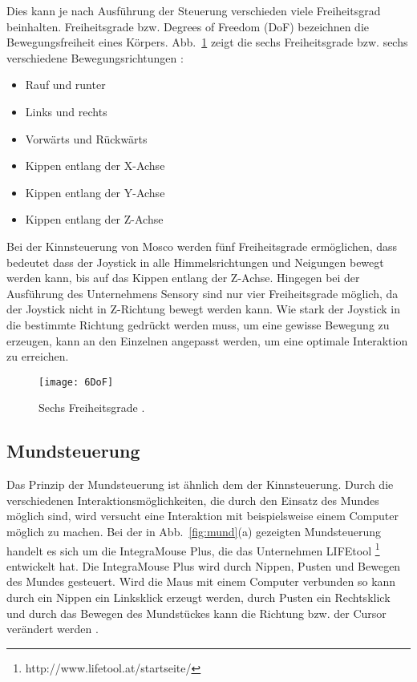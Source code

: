 \newline
Dies kann je nach Ausführung der Steuerung verschieden viele Freiheitsgrad beinhalten. Freiheitsgrade bzw. Degrees of Freedom (DoF) bezeichnen die Bewegungsfreiheit eines Körpers. Abb.~\ref{fig:6DoF} zeigt die sechs Freiheitsgrade bzw. sechs verschiedene Bewegungsrichtungen \cite{6DoF}:
\begin{itemize}
      \item Rauf und runter 
      \item Links und rechts 
			\item Vorwärts und Rückwärts 
			\item Kippen entlang der X-Achse 
      \item Kippen entlang der Y-Achse
			\item Kippen entlang der Z-Achse
\end{itemize}
%
\newline
Bei der Kinnsteuerung von Mosco werden fünf Freiheitsgrade ermöglichen, dass bedeutet dass der Joystick in alle Himmelsrichtungen und Neigungen bewegt werden kann, bis auf das Kippen entlang der Z-Achse. Hingegen bei der Ausführung des Unternehmens Sensory sind nur vier Freiheitsgrade möglich, da der Joystick nicht in Z-Richtung bewegt werden kann. 
Wie stark der Joystick in die bestimmte Richtung gedrückt werden muss, um eine gewisse Bewegung zu erzeugen, kann an den Einzelnen angepasst werden, um eine optimale Interaktion zu erreichen.
%
\begin{figure}
\centering
\texttt{[image: 6DoF]}
\caption{Sechs Freiheitsgrade \cite{6DoFPic}.}
\label{fig:6DoF}
\end{figure}
%
%

\subsection{Mundsteuerung}

Das Prinzip der Mundsteuerung ist ähnlich dem der Kinnsteuerung. Durch die verschiedenen Interaktionsmöglichkeiten, die durch den Einsatz des Mundes möglich sind, wird versucht eine Interaktion mit beispielsweise einem Computer möglich zu machen.
\newline \newline
Bei der in Abb.~\ref{fig:mund}(a) gezeigten Mundsteuerung handelt es sich um die IntegraMouse Plus, die das Unternehmen LIFEtool%
\footnote{http://www.lifetool.at/startseite/}
%
entwickelt hat. Die IntegraMouse Plus wird durch Nippen, Pusten und Bewegen des Mundes gesteuert. Wird die Maus mit einem Computer verbunden so kann durch ein Nippen ein Linksklick erzeugt werden, durch Pusten ein Rechtsklick und durch das Bewegen des Mundstückes kann die Richtung bzw. der Cursor verändert werden \cite{INTEGRA_VIDEO}.
 
